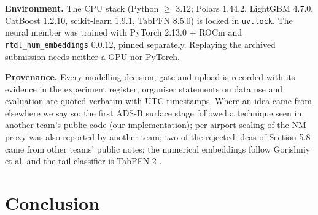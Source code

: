 \documentclass[11pt,a4paper]{article}
\begin{document}
\textbf{Environment.} The CPU stack (Python $\ge$ 3.12; Polars 1.44.2, LightGBM 4.7.0, CatBoost 1.2.10, scikit-learn 1.9.1, TabPFN 8.5.0) is locked in \texttt{uv.lock}. The neural member was trained with PyTorch 2.13.0 + ROCm and \texttt{rtdl\_\allowbreak{}num\_\allowbreak{}embeddings} 0.0.12, pinned separately. Replaying the archived submission needs neither a GPU nor PyTorch.

\textbf{Provenance.} Every modelling decision, gate and upload is recorded with its evidence in the experiment register; organiser statements on data use and evaluation are quoted verbatim with UTC timestamps. Where an idea came from elsewhere we say so: the first ADS-B surface stage followed a technique seen in another team's public code (our implementation); per-airport scaling of the NM proxy was also reported by another team; two of the rejected ideas of Section 5.8 came from other teams' public notes; the numerical embeddings follow Gorishniy et al. \autocite{gorishniy2022embeddings} and the tail classifier is TabPFN-2 \autocite{hollmann2025tabpfn}.

\section{Conclusion}\label{conclusion}
\end{document}
